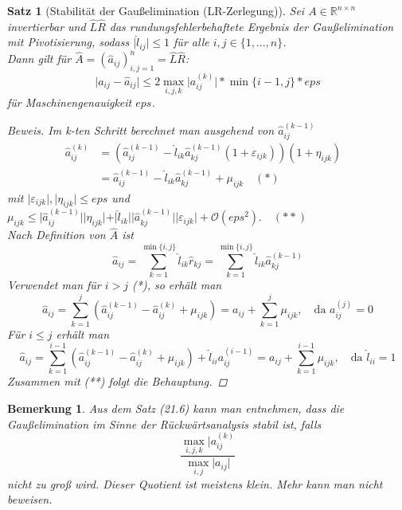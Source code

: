 \documentclass[12pt]{article}
\theoremstyle{break}
\newtheorem{theorem}{Satz}[subsection]
\newtheorem*{comment*}{Bemerkung}
\begin{document}
\begin{theorem}[Stabilität der Gaußelimination (LR-Zerlegung)]
Sei $A \in \mathbb{R}^{n \times n}$ invertierbar und $\hat{L}\hat{R}$ das rundungsfehlerbehaftete Ergebnis der Gaußelimination mit Pivotisierung, sodass $\vert \hat{l}_{ij} \vert \leq 1$ für alle $i,j \in \{1,..., n\}$. \\
Dann gilt für $\hat{A} = (\hat{a}_{ij})_{i,j=1}^n = \hat{L}\hat{R}$:
$$\vert a_{ij} - \hat{a}_{ij} \vert \leq 2 \max_{i,j,k} \vert a_{ij}^{(k)} \vert * \min\{i-1, j\} * eps$$
für Maschinengenauigkeit $eps$.
\begin{proof}[Beweis]
Im k-ten Schritt berechnet man ausgehend von $\hat{a}_{ij}^{(k-1)}$
\begin{align*}
\hat{a}_{ij}^{(k)} &= \left( \hat{a}_{ij}^{(k-1)} - \hat{l}_{ik} \hat{a}_{kj}^{(k-1)} ( 1+ \varepsilon_{ijk}) \right) ( 1+ \eta_{ijk}) &\\
&= \hat{a}_{ij}^{(k-1)} - \hat{l}_{ik} \hat{a}_{kj}^{(k-1)} + \mu_{ijk} \quad (*)
\end{align*}
mit $\vert \varepsilon_{ijk} \vert, \vert \eta_{ijk} \vert \leq eps$ und $\mu_{ijk} \leq \vert \hat{a}_{ij}^{(k-1)} \vert \vert \eta_{ijk} \vert + \vert \hat{l}_{ik} \vert \vert \hat{a}_{kj}^{(k-1)} \vert \vert \varepsilon_{ijk} \vert + \mathcal{O}(eps^2). \quad (**)$\\
Nach Definition von $\hat{A}$ ist 
$$\hat{a}_{ij} = \sum_{k=1}^{\min\{i,j\}} \hat{l}_{ik} \hat{r}_{kj} = \sum_{k=1}^{\min\{i,j\}} \hat{l}_{ik} \hat{a}_{kj}^{(k-1)}$$ 
Verwendet man für $i > j$ (*), so erhält man
$$\hat{a}_{ij} = \sum_{k=1}^j \left( \hat{a}_{ij}^{(k-1)} - \hat{a}_{ij}^{(k)} + \mu_{ijk} \right) = a_{ij} + \sum_{k=1}^j \mu_{ijk}, \quad \text{da } a_{ij}^{(j)} = 0$$
Für $i \leq j $ erhält man
$$\hat{a}_{ij} = \sum_{k=1}^{i-1} \left( \hat{a}_{ij}^{(k-1)} - \hat{a}_{ij}^{(k)} + \mu_{ijk} \right) + \hat{l}_{ii} a_{ij}^{(i-1)}= a_{ij} + \sum_{k=1}^{i-1} \mu_{ijk}, \quad \text{da } \hat{l}_{ii} = 1$$
Zusammen mit (**) folgt die Behauptung.
\end{proof}
\end{theorem}

\begin{comment*}
Aus dem Satz (21.6) kann man entnehmen, dass die Gaußelimination im Sinne der Rückwärtsanalysis stabil ist, falls 
$$\frac{\max_{i,j,k} \vert a_{ij}^{(k)}}{\max_{i,j} \vert a_{ij} \vert }$$
nicht zu groß wird. Dieser Quotient ist meistens klein. Mehr kann man nicht beweisen.
\end{comment*}
\end{document}
